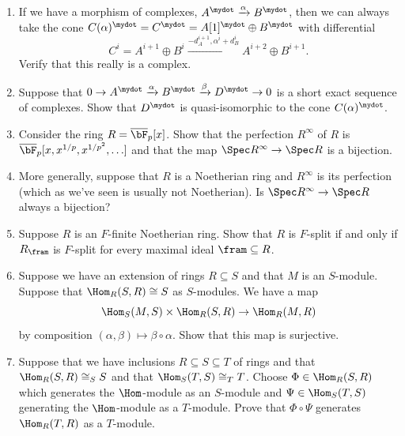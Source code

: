 \documentclass[12pt]{amsart}
\numberwithin{equation}{theorem}
\renewcommand{\:}{\colon}
\theoremstyle{theorem}
\begin{document}
\begin{enumerate}[label=(\arabic*)]
\item If we have a morphism of complexes, $A^{\mydot} \xrightarrow{\alpha} B^{\mydot}$, then we can always take the cone $C(\alpha)^{\mydot} = C^{\mydot} =  A[1]^{\mydot} \oplus B^{\mydot}$ with differential
\[
C^i = A^{i+1} \oplus B^i \xrightarrow{-d_A^{i+1}, \alpha^i + d_B^i} A^{i+2} \oplus B^{i+1}.
\]
Verify that this really is a complex.
\item Suppose that $0 \to A^{\mydot} \xrightarrow{\alpha} B^{\mydot} \xrightarrow{\beta} D^{\mydot} \to 0$ is a short exact sequence of complexes.  Show that $D^{\mydot}$ is quasi-isomorphic to the cone $C(\alpha)^{\mydot}$.  
\item Consider the ring $R = {\overline \bF}_p[x]$.  Show that the perfection $R^{\infty}$ of $R$ is ${\overline \bF}_p[x, x^{1/p}, x^{1/p^2}, \ldots]$ and that the map $\Spec R^{\infty} \to \Spec R$ is a bijection.
\item More generally, suppose that $R$ is a Noetherian ring and $R^{\infty}$ is its perfection (which as we've seen is usually not Noetherian).  Is $\Spec R^{\infty} \to \Spec R$ always a bijection?
\item Suppose $R$ is an $F$-finite Noetherian ring.  Show that $R$ is $F$-split if and only if $R_{\fram}$ is $F$-split for every maximal ideal $\fram \subseteq R$.
\item Suppose we have an extension of rings $R \subseteq S$ and that $M$ is an $S$-module.  Suppose that $\Hom_R(S, R) \cong S$ as $S$-modules.  We have a map
    \[
        \Hom_S(M, S) \times \Hom_R(S, R) \to \Hom_R(M, R)
    \]
    by composition $(\alpha, \beta) \mapsto \beta \circ \alpha$.  Show that this map is surjective.
\item Suppose that we have inclusions $R \subseteq S \subseteq T$ of rings and that $\Hom_R(S, R) \cong_S S$ and that $\Hom_S(T,S) \cong_T T$.  Choose $\Phi \in \Hom_R(S, R)$ which generates the $\Hom$-module as an $S$-module and $\Psi \in \Hom_S(T, S)$ generating the $\Hom$-module as a $T$-module.  Prove that $\Phi \circ \Psi$ generates $\Hom_R(T, R)$ as a $T$-module.
\end{enumerate}
\end{document}
